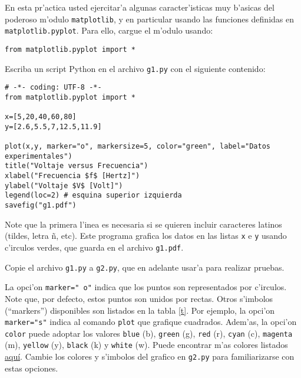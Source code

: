 \documentclass[11pt]{exam}
\begin{document}
\firstpageheadrule
\runningheadrule
{}
\cfoot{ }
\begin{flushleft}
\vspace{0.2in}
\vspace{0.25cm}
\end{flushleft}

\begin{questions}

\item En esta pr'actica usted ejercitar'a algunas caracter'isticas muy b'asicas del  poderoso m'odulo \texttt{matplotlib}, y en particular usando las funciones definidas en \texttt{matplotlib.pyplot}. Para ello, cargue el m'odulo usando:
\begin{verbatim}
from matplotlib.pyplot import *
\end{verbatim}
\item Escriba un script Python en el archivo \texttt{g1.py} con el siguiente contenido:
\begin{verbatim}
# -*- coding: UTF-8 -*-
from matplotlib.pyplot import *

x=[5,20,40,60,80]
y=[2.6,5.5,7,12.5,11.9]

plot(x,y, marker="o", markersize=5, color="green", label="Datos experimentales")
title("Voltaje versus Frecuencia")
xlabel("Frecuencia $f$ [Hertz]")
ylabel("Voltaje $V$ [Volt]")
legend(loc=2) # esquina superior izquierda
savefig("g1.pdf")
\end{verbatim}
Note que la primera l'inea es necesaria si se quieren incluir caracteres latinos (tildes, letra \~n, etc). Este programa grafica los datos en las listas \texttt{x} e \texttt{y} usando c'irculos verdes, que guarda en el archivo \texttt{g1.pdf}.
\item Copie el archivo \texttt{g1.py} a \texttt{g2.py}, que en adelante usar'a para realizar pruebas. 
\item La opci'on \texttt{marker="\,o"} indica que los puntos son representados por c'irculos. Note que, por defecto, estos puntos son unidos por rectas. Otros s'imbolos (``markers'') disponibles son listados en la tabla \ref{t}. Por ejemplo, la opci'on \texttt{marker="s"} indica al comando \texttt{plot} que grafique cuadrados. 
Adem'as, la opci'on \texttt{color} puede adoptar los valores \texttt{blue} (b), \texttt{green} (g), \texttt{red} (r), \texttt{cyan} (c), \texttt{magenta} (m), \texttt{yellow} (y), \texttt{black} (k) y \texttt{white} (w). Puede encontrar m'as colores listados \href{http://matplotlib.org/examples/color/named_colors.html}{aqu\'i}. Cambie los colores y s'imbolos del grafico en \texttt{g2.py} para familiarizarse con estas opciones.


\end{questions}
\end{document}

